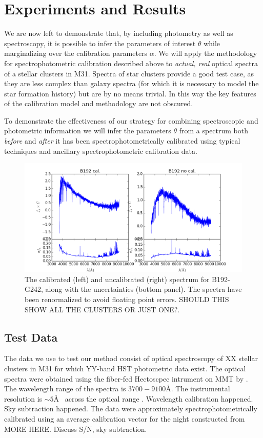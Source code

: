 \documentclass[iop,numberedappendix]{emulateapj}
\newcommand{\excluster}{B192-G242}
\begin{document}
\section{Experiments and Results}

We are now left to demonstrate that, by including photometry as well
as spectroscopy, it is possible to infer the parameters of interest
$\theta$ while marginalizing over the calibration parameters $\alpha$.
We will apply the methodology for spectrophotometric calibration
described above to \emph{actual, real} optical spectra of a stellar
clusters in M31.  Spectra of star clusters provide a good test case,
as they are less complex than galaxy spectra (for which it is
necessary to model the star formation history) but are by no means
trivial. In this way the key features of the calibration model and
methodology are not obscured.

To demonstrate the effectiveness of our strategy for combining
spectroscopic and photometric information we will infer the parameters
$\theta$ from a spectrum both \emph{before} and \emph{after} it has
been spectrophotometrically calibrated using typical techniques and
ancillary spectrophotometric calibration data.

\begin{figure}[h!]
\includegraphics[width = 0.5 \textwidth]{figures/dfig_b192-g242_020.png}
\caption{The calibrated (left) and uncalibrated (right) spectrum for
\excluster, along with the uncertainties (bottom panel). The spectra
have been renormalized to avoid floating point errors. {\color{blue}
SHOULD THIS SHOW ALL THE CLUSTERS OR JUST ONE?.}\label{fig:data}}
\end{figure}


\subsection{Test Data}

The data we use to test our method consist of optical spectroscopy of
XX stellar clusters in M31 for which YY-band HST photometric data
exist.  The optical spectra were obtained using the fiber-fed
Hectoscpec intrument on MMT by \citet{caldwell}.  The wavelength range
of the spectra is $3700-9100$\AA. The instrumental resolution is
$\sim 5$\AA~ across the optical range \citep{fabricant13}.  {\color{blue} Wavelength
calibration happened. Sky subtraction happened.} The data were
approximately spectrophotometrically calibrated using an average
calibration vector for the night constructed from {\color{blue} MORE
HERE. Discuss S/N, sky subtraction.}
\end{document}
